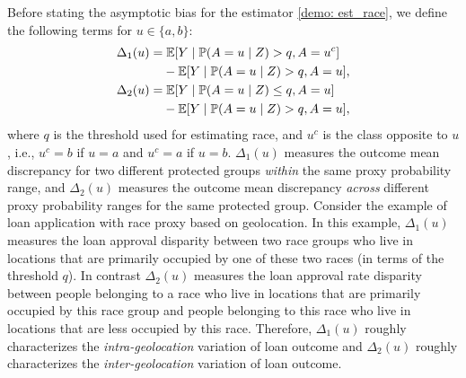 Before stating the asymptotic bias for the estimator \eqref{demo: est_race}, we define the following terms for $u \in \{a, b\}$:
\begin{align*}
    \Delta_1(u) = &\; \mathbb{E} [Y \mid \mathbb{P}(A = u \mid Z) > q, A = u^c]\\
    & - \mathbb{E} [Y \mid \mathbb{P}(A = u \mid Z) > q, A = u], \\
    \Delta_2(u) = &\; \mathbb{E} [Y \mid \mathbb{P}(A = u\mid Z) \le q, A = u] \\
    & - \mathbb{E} [Y \mid \mathbb{P}(A = u\mid Z) > q, A = u],
\end{align*}
where $q$ is the threshold used for estimating race, and $u^c$ is the class opposite to $u$, i.e., $u^c = b$ if $u = a$ and $u^c = a$ if $u = b$. $\Delta_1(u)$ measures the outcome mean discrepancy for two different protected groups \textit{within} the same proxy probability range, and $\Delta_2(u)$ measures the outcome mean discrepancy \textit{across} different proxy probability ranges for the same protected group. Consider the example of loan application with race proxy based on geolocation. In this example, $\Delta_1(u)$ measures the loan approval disparity between two race groups who live in locations that are primarily occupied by one of these two races (in terms of the threshold $q$). In contrast $\Delta_2(u)$ measures the loan approval rate disparity between people belonging to a race who live in locations that are primarily occupied by this race group and people belonging to this race who live in locations that are less occupied by this race. Therefore, $\Delta_1(u)$ roughly characterizes the \textit{intra-geolocation} variation of loan outcome and $\Delta_2(u)$ roughly characterizes the \textit{inter-geolocation} variation of loan outcome.

